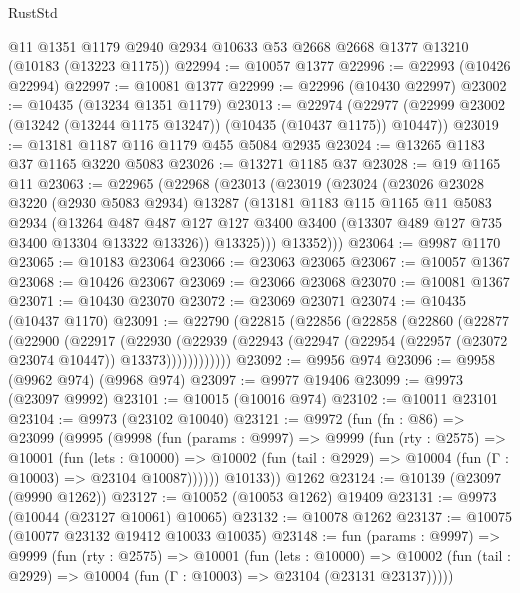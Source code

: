 \begin{lexlean}{RustStd}
\begin{coremodule}
    @11
    @1351
    @1179
    @2940
    @2934
    @10633
    @53
    @2668
    @2668
    @1377
    @13210
    (@10183 (@13223 @1175))
@22994 := @10057 @1377
@22996 := @22993 (@10426 @22994)
@22997 := @10081 @1377
@22999 := @22996 (@10430 @22997)
@23002 := @10435 (@13234 @1351 @1179)
@23013 := @22974
    (@22977 (@22999 @23002 (@13242 (@13244 @1175 @13247)) (@10435 (@10437 @1175)) @10447))
@23019 := @13181 @1187 @116 @1179 @455 @5084 @2935
@23024 := @13265 @1183 @37 @1165 @3220 @5083
@23026 := @13271 @1185 @37
@23028 := @19 @1165 @11
@23063 := @22965
    (@22968
      (@23013
        (@23019
          (@23024
            (@23026
              @23028
              @3220
              (@2930 @5083 @2934)
              @13287
              (@13181
                @1183
                @115
                @1165
                @11
                @5083
                @2934
                (@13264
                  @487
                  @487
                  @127
                  @127
                  @3400
                  @3400
                  (@13307 @489 @127 @735 @3400 @13304 @13322 @13326))
                @13325)))
          @13352)))
@23064 := @9987 @1170
@23065 := @10183 @23064
@23066 := @23063 @23065
@23067 := @10057 @1367
@23068 := @10426 @23067
@23069 := @23066 @23068
@23070 := @10081 @1367
@23071 := @10430 @23070
@23072 := @23069 @23071
@23074 := @10435 (@10437 @1170)
@23091 := @22790
    (@22815
      (@22856
        (@22858
          (@22860
            (@22877
              (@22900
                (@22917
                  (@22930
                    (@22939
                      (@22943 (@22947 (@22954 (@22957 (@23072 @23074 @10447)) @13373))))))))))))
@23092 := @9956 @974
@23096 := @9958 (@9962 @974) (@9968 @974)
@23097 := @9977 @19406
@23099 := @9973 (@23097 @9992)
@23101 := @10015 (@10016 @974)
@23102 := @10011 @23101
@23104 := @9973 (@23102 @10040)
@23121 := @9972
    (fun (fn : @86) =>
    @23099
      (@9995
        (@9998
          (fun (params : @9997) =>
          @9999
            (fun (rty : @2575) =>
            @10001
              (fun (lets : @10000) =>
              @10002 (fun (tail : @2929) => @10004 (fun (Γ : @10003) => @23104 @10087))))))
        @10133))
    @1262
@23124 := @10139 (@23097 (@9990 @1262))
@23127 := @10052 (@10053 @1262) @19409
@23131 := @9973 (@10044 (@23127 @10061) @10065)
@23132 := @10078 @1262
@23137 := @10075 (@10077 @23132 @19412 @10033 @10035)
@23148 := fun (params : @9997) =>
  @9999
    (fun (rty : @2575) =>
    @10001
      (fun (lets : @10000) =>
      @10002 (fun (tail : @2929) => @10004 (fun (Γ : @10003) => @23104 (@23131 @23137)))))

\end{coremodule}
\end{lexlean}
